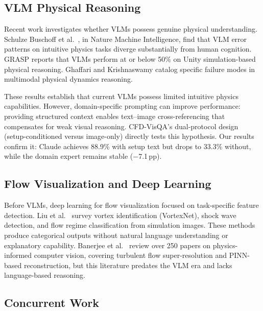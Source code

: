 \documentclass[preprint,12pt]{elsarticle}
\begin{document}
\subsection{VLM Physical Reasoning}

Recent work investigates whether VLMs possess genuine physical
understanding. Schulze Buschoff et al.\ \cite{schulzebuschoff.etal2025VisualCognition}, in Nature
Machine Intelligence, find that VLM error patterns on intuitive physics tasks
diverge substantially from human cognition. GRASP \cite{jassim.etal2024GRASPNovel} reports
that VLMs perform at or below 50\% on Unity simulation-based physical reasoning.
Ghaffari and Krishnaswamy \cite{ghaffari.krishnaswamy2024ExploringFailure} catalog specific failure
modes in multimodal physical dynamics reasoning.

These results establish that current VLMs possess limited intuitive physics
capabilities. However, domain-specific prompting can improve performance: providing
structured context enables text--image cross-referencing that compensates for weak
visual reasoning. CFD-VisQA's dual-protocol design (setup-conditioned versus
image-only) directly tests this hypothesis. Our results confirm it: Claude
achieves 88.9\% with setup text but drops to 33.3\% without, while the domain
expert remains stable ($-$7.1\,pp).

\subsection{Flow Visualization and Deep Learning}

Before VLMs, deep learning for flow visualization focused on task-specific feature
detection. Liu et al.\ \cite{liu.etal2022DeepLearning} survey vortex identification
(VortexNet), shock wave detection, and flow regime classification from simulation
images. These methods produce categorical outputs without natural language
understanding or explanatory capability. Banerjee et al.\
\cite{banerjee.etal2024PhysicsInformedComputer} review over 250 papers on physics-informed
computer vision, covering turbulent flow super-resolution and PINN-based
reconstruction, but this literature predates the VLM era and lacks language-based
reasoning.

\subsection{Concurrent Work}
\end{document}
